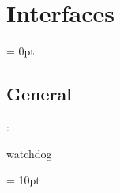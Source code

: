 
\section{Interfaces} 


\parskip = 0pt

\vspace{3mm} \subsection*{General}

: 

watchdog
\vspace{2mm}

\vspace{5mm}\parskip = 10pt 
